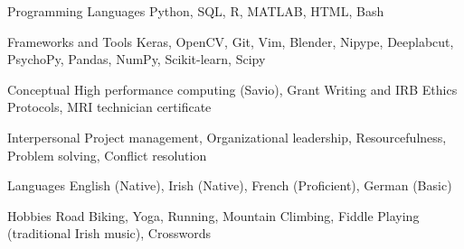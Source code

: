 

\begin{cvskills}

 \cvskill
  	{Programming Languages}
    {Python, SQL, R, MATLAB, HTML, Bash} %
  
 \cvskill
   {Frameworks and Tools}
   {Keras, OpenCV, Git, Vim, Blender, Nipype, Deeplabcut, PsychoPy, Pandas, NumPy, Scikit-learn, Scipy}
   
 \cvskill
   {Conceptual}
   {High performance computing (Savio), Grant Writing and IRB Ethics Protocols, MRI technician certificate}
  
 \cvskill
   {Interpersonal}
   {Project management, Organizational leadership, Resourcefulness, Problem solving, Conflict resolution}
   
  \cvskill
   {Languages}
   {English (Native), Irish (Native), French (Proficient), German (Basic)}
   
 \cvskill
   {Hobbies}
   {Road Biking, Yoga, Running, Mountain Climbing, Fiddle Playing (traditional Irish music), Crosswords}
    

\end{cvskills}
